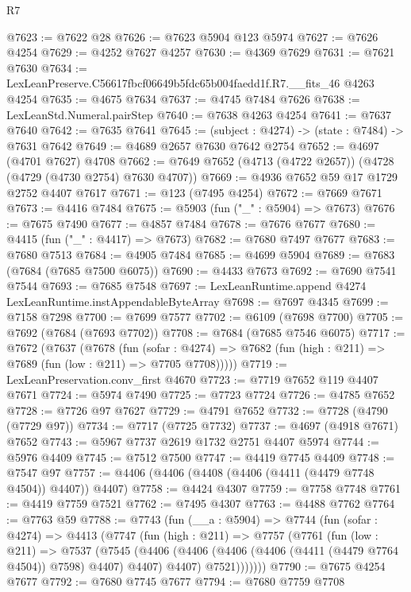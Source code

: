 \begin{lexlean}{R7}
\begin{coremodule}
@7623 := @7622 @28
@7626 := @7623 @5904 @123 @5974
@7627 := @7626 @4254
@7629 := @4252 @7627 @4257
@7630 := @4369 @7629
@7631 := @7621 @7630
@7634 := LexLeanPreserve.C56617fbcf06649b5fdc65b004faedd1f.R7.__fits_46 @4263 @4254
@7635 := @4675 @7634
@7637 := @4745 @7484 @7626
@7638 := LexLeanStd.Numeral.pairStep
@7640 := @7638 @4263 @4254
@7641 := @7637 @7640
@7642 := @7635 @7641
@7645 := (subject : @4274) -> (state : @7484) -> @7631 @7642
@7649 := @4689 @2657 @7630 @7642 @2754
@7652 := @4697 (@4701 @7627) @4708
@7662 := @7649 @7652 (@4713 (@4722 @2657)) (@4728 (@4729 (@4730 @2754) @7630 @4707))
@7669 := @4936 @7652 @59 @17 @1729 @2752 @4407 @7617
@7671 := @123 (@7495 @4254)
@7672 := @7669 @7671
@7673 := @4416 @7484
@7675 := @5903 (fun ("_" : @5904) => @7673)
@7676 := @7675 @7490
@7677 := @4857 @7484
@7678 := @7676 @7677
@7680 := @4415 (fun ("_" : @4417) => @7673)
@7682 := @7680 @7497 @7677
@7683 := @7680 @7513
@7684 := @4905 @7484
@7685 := @4699 @5904
@7689 := @7683 (@7684 (@7685 @7500 @6075))
@7690 := @4433 @7673
@7692 := @7690 @7541 @7544
@7693 := @7685 @7548
@7697 := LexLeanRuntime.append @4274 LexLeanRuntime.instAppendableByteArray
@7698 := @7697 @4345
@7699 := @7158 @7298
@7700 := @7699 @7577
@7702 := @6109 (@7698 @7700)
@7705 := @7692 (@7684 (@7693 @7702))
@7708 := @7684 (@7685 @7546 @6075)
@7717 := @7672
    (@7637
      (@7678
        (fun (sofar : @4274) =>
        @7682 (fun (high : @211) => @7689 (fun (low : @211) => @7705 @7708)))))
@7719 := LexLeanPreservation.conv_first @4670
@7723 := @7719 @7652 @119 @4407 @7671
@7724 := @5974 @7490
@7725 := @7723 @7724
@7726 := @4785 @7652
@7728 := @7726 @97 @7627
@7729 := @4791 @7652
@7732 := @7728 (@4790 (@7729 @97))
@7734 := @7717 (@7725 @7732)
@7737 := @4697 (@4918 @7671) @7652
@7743 := @5967 @7737 @2619 @1732 @2751 @4407 @5974
@7744 := @5976 @4409
@7745 := @7512 @7500
@7747 := @4419 @7745 @4409
@7748 := @7547 @97
@7757 := @4406 (@4406 (@4408 (@4406 (@4411 (@4479 @7748 @4504)) @4407)) @4407)
@7758 := @4424 @4307
@7759 := @7758 @7748
@7761 := @4419 @7759 @7521
@7762 := @7495 @4307
@7763 := @4488 @7762
@7764 := @7763 @59
@7788 := @7743
    (fun (__a : @5904) =>
    @7744
      (fun (sofar : @4274) =>
      @4413
        (@7747
          (fun (high : @211) =>
          @7757
            (@7761
              (fun (low : @211) =>
              @7537
                (@7545
                  (@4406
                    (@4406 (@4406 (@4406 (@4411 (@4479 @7764 @4504)) @7598) @4407) @4407)
                    @4407)
                  @7521)))))))
@7790 := @7675 @4254 @7677
@7792 := @7680 @7745 @7677
@7794 := @7680 @7759 @7708

\end{coremodule}
\end{lexlean}
